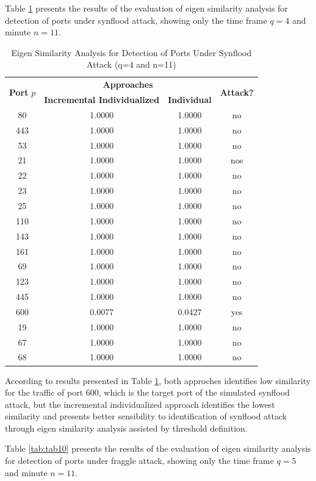 \documentclass[review]{elsarticle}
\begin{document}
Table \ref{tab:tab9} presents the results of the evaluation of eigen similarity analysis for detection of ports under synflood attack, showing only the time frame $q=4$ and minute $n=11$.

\begin{table}[h!]
  \centering
  \footnotesize
  \caption{Eigen Similarity Analysis for Detection of Ports Under Synflood Attack (q=4 and n=11)}
  \label{tab:tab9}
  \begin{tabular}{ c c c c }
	\toprule
	\multirow{2}{*}{\textbf{Port} $p$}   &\multicolumn{2}{c}{\textbf{Approaches}} &\multirow{2}{*}{\textbf{Attack?}}\\ 
			\hhline{~--~}
			&\textbf{Incremental Individualized} &\textbf{Individual}\\
	\midrule
	80 &1.0000 &1.0000 &no \\
	443 &1.0000 &1.0000 &no \\
	53 &1.0000 &1.0000 &no \\
	21 &1.0000 &1.0000 &nos \\
	22 &1.0000 &1.0000 &no \\
	23 &1.0000 &1.0000 &no \\
	25 &1.0000 &1.0000 &no \\
	110 &1.0000 &1.0000 &no \\
	143 &1.0000 &1.0000 &no \\
	161 &1.0000 &1.0000 &no \\
	69 &1.0000 &1.0000 &no \\
	123 &1.0000 &1.0000 &no \\
	445 &1.0000 &1.0000 &no \\
	600 &0.0077 &0.0427 &yes \\
	19 &1.0000 &1.0000 &no \\
	67 &1.0000 &1.0000 &no \\
	68 &1.0000 &1.0000 &no \\
    \bottomrule
  \end{tabular}
\end{table}

According to results presented in Table \ref{tab:tab9}, both approches identifies low similarity for the traffic of port 600, which is the target port of the simulated synflood attack, but the incremental individualized approach identifies the lowest similarity and presents better sensibility to identification of synflood attack through eigen similarity analysis assisted by threshold definition.

Table \ref{tab:tab10} presents the results of the evaluation of eigen similarity analysis for detection of ports under fraggle attack, showing only the time frame $q=5$ and minute $n=11$.
\end{document}
